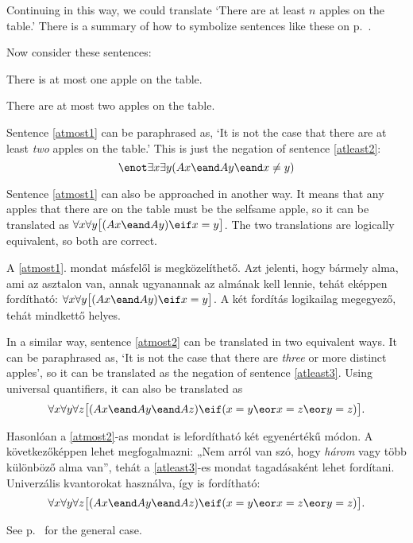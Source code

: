 Continuing in this way, we could translate `There are at least $n$ apples on the table.' There is a summary of how to symbolize sentences like these on p.~\pageref{summary.atleast}.


Now consider these sentences:
\begin{earg}
\item[\ex{atmost1}] There is at most one apple on the table.
\item[\ex{atmost2}] There are at most two apples on the table.
\end{earg}

Sentence \ref{atmost1} can be paraphrased as, `It is not the case that there are at least \emph{two} apples on the table.' This is just the negation of sentence \ref{atleast2}: $$\enot \exists x \exists y(Ax \eand Ay \eand x\neq y)$$



Sentence \ref{atmost1} can also be approached in another way. It means that any apples that there are on the table must be the selfsame apple, so it can be translated as $\forall x\forall y\bigl[(Ax \eand Ay) \eif x=y\bigr]$. The two translations are logically equivalent, so both are correct.

A \ref{atmost1}. mondat másfelől is megközelíthető. Azt jelenti, hogy bármely alma, ami az asztalon van, annak ugyanannak az almának kell lennie, tehát eképpen fordítható: $\forall x\forall y\bigl[(Ax \eand Ay) \eif x=y\bigr]$. A két fordítás logikailag megegyező, tehát mindkettő helyes.

In a similar way, sentence \ref{atmost2} can be translated in two equivalent ways. It can be paraphrased as, `It is not the case that there are \emph{three} or more distinct apples', so it can be translated as the negation of sentence \ref{atleast3}. Using universal quantifiers, it can also be translated as
$$\forall x\forall y\forall z\bigl[(Ax \eand Ay \eand Az) \eif (x=y \eor x=z \eor y=z)\bigr].$$

Hasonlóan a \ref{atmost2}-as mondat is lefordítható két egyenértékű módon. A következőképpen lehet megfogalmazni: „Nem arról van szó, hogy \emph{három} vagy több különböző alma van”, tehát a \ref{atleast3}-es mondat tagadásaként lehet fordítani. Univerzális kvantorokat használva, így is fordítható:
$$\forall x\forall y\forall z\bigl[(Ax \eand Ay \eand Az) \eif (x=y \eor x=z \eor y=z)\bigr].$$

See p.~\pageref{summary.atmost} for the general case.

